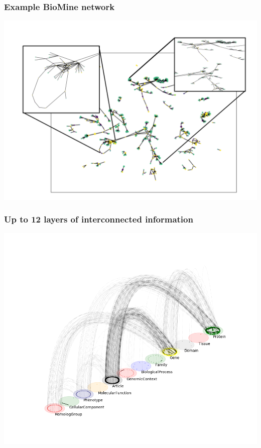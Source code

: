 \documentclass{beamer}
\begin{document}
\begin{frame}\frametitle{Example BioMine network}
   \includegraphics[scale=0.60]{images/collage}
\end{frame}


\begin{frame}\frametitle{Up to 12 layers of interconnected information}  
  \includegraphics[scale=0.45]{images/SNPmpx}    
\end{frame}
\end{document}
